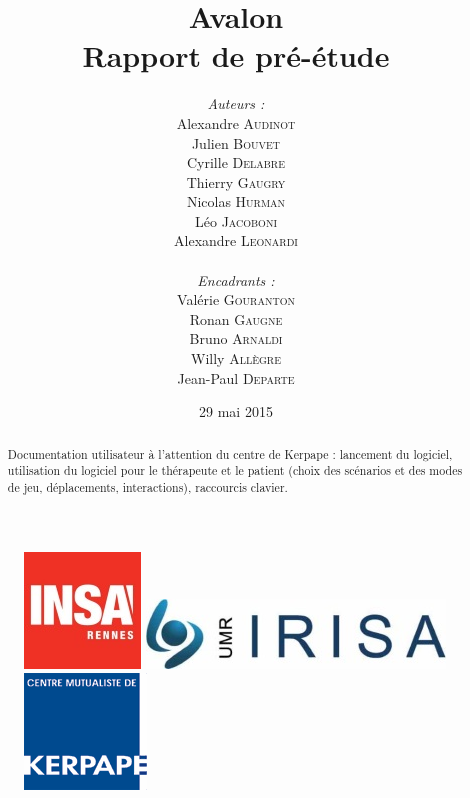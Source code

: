 \documentclass[a4paper,11pt]{article}
\title{
  \textbf{Avalon}\\
  Rapport de pré-étude
}
\author{
\begin{minipage}{0.4\textwidth}
	\begin{flushleft} \large
		\emph{Auteurs :}\\
		Alexandre \textsc{Audinot}\\
		Julien \textsc{Bouvet}\\
		Cyrille \textsc{Delabre}\\
		Thierry \textsc{Gaugry}\\
		Nicolas \textsc{Hurman}\\
		Léo \textsc{Jacoboni}\\
		Alexandre \textsc{Leonardi}\\
	\end{flushleft}
\end{minipage}
\begin{minipage}{0.4\textwidth}
	\begin{flushright} \large
		\emph{Encadrants :} \\
		Valérie \textsc{Gouranton}\\
		Ronan \textsc{Gaugne}\\
		Bruno \textsc{Arnaldi}\\
		Willy \textsc{Allègre}\\
		Jean-Paul  \textsc{Departe}\\
	\end{flushright}
\end{minipage}
}
\date{29 mai 2015}
\begin{document}
\maketitle
\thispagestyle{empty}
\begin{abstract}
Documentation utilisateur à l'attention du centre de Kerpape : lancement du logiciel, utilisation du logiciel pour le thérapeute et le patient (choix des scénarios et des modes de jeu, déplacements, interactions), raccourcis clavier. 
\end{abstract}

\begin{figure}[h!]
   \begin{minipage}{0.3\linewidth}
      \includegraphics[scale=0.9]{1-PreEtude/img/logo_insa.jpeg}
   \end{minipage} 
   \begin{minipage}{0.2\linewidth}
      \centering
      \includegraphics[scale=0.5,left]{1-PreEtude/img/logo_irisa.jpg}
   \end{minipage}\hfill
   \begin{minipage}{0.2\linewidth}
      \includegraphics[scale=0.9]{1-PreEtude/img/logo_kerpape.png}
   \end{minipage}
\end{figure}

\pagebreak

\tableofcontents
\pagebreak



\pagebreak

\pagebreak

\pagebreak

\pagebreak

\pagebreak

\pagebreak
\end{document}
